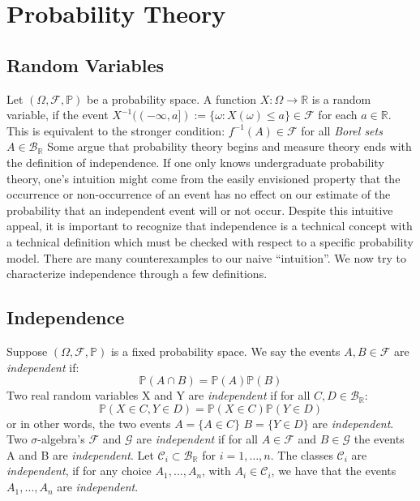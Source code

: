 \documentclass{article}
\begin{document}
\section{Probability Theory}

\subsection{Random Variables}
Let $(\Omega,\mathcal{F}, \mathbb{P})$ be a probability space. A function $X:\Omega\to\mathbb{R}$ is a random variable, if the event $X^{-1}((-\infty,a]):=\{\omega:X(\omega)\leq a\}\in\mathcal{F}$ for each $a \in \mathbb{R}$. This is equivalent to the stronger condition: $f^{-1}(A)\in\mathcal{F}$ for all \emph{Borel sets} $A\in\mathcal{B}_\mathbb{R}$  \newline \newline
Some argue that probability theory begins and measure theory ends with the definition of independence. If one only knows undergraduate probability theory, one's intuition might come from the easily envisioned property that the occurrence or non-occurrence of an event has no effect on our estimate of the probability that an independent event will or not occur.
Despite this intuitive appeal, it is important to recognize that independence is a technical concept with a technical definition which must be checked with respect to a specific probability model. There are many counterexamples to our naive ``intuition''. We now try to characterize independence through a few definitions.
\subsection{Independence}
Suppose $(\Omega, \mathcal{F},\mathbb{P})$ is a fixed probability space. We say the events $A, B \in \mathcal{F}$ are \emph{independent} if: \[
\mathbb{P}(A \cap B) = \mathbb{P}(A)\mathbb{P}(B)
\]
Two real random variables X and Y are \emph{independent} if for all $C,D\in\mathcal{B}_{\mathbb{R}}:$
\[
\mathbb{P}(X\in C,Y\in D)=\mathbb{P}(X\in C)\mathbb{P}(Y\in D)
\]
or in other words, the two events $A=\{A\in C\}$ $B=\{Y\in D\}$ are \emph{independent}.\newline \newline
Two $\sigma$-algebra's $\mathcal{F}$ and $\mathcal{G}$ are \emph{independent} if for all $A \in \mathcal{F}$ and $B \in \mathcal{G}$ the events A and B are \emph{independent}.\newline \newline
Let $\mathcal{C}_i\subset \mathcal{B}_{\mathbb{R}}$ for $i=1,\ldots,n$. The classes $\mathcal{C}_i$ are \emph{independent}, if for any choice $A_1,\ldots,A_n$, with $A_i\in\mathcal{C}_i$, we have that the events $A_1,\ldots,A_n$ are \emph{independent}.
\end{document}
